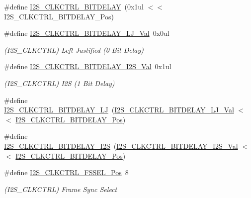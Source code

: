 \begin{DoxyCompactItemize}
\#define \mbox{\hyperlink{group___s_a_m_d21___i2_s_ga2d8c66be6d6b5f64aacba964e48a5ea5}{I2\+S\+\_\+\+C\+L\+K\+C\+T\+R\+L\+\_\+\+B\+I\+T\+D\+E\+L\+AY}}~(0x1ul $<$$<$ I2\+S\+\_\+\+C\+L\+K\+C\+T\+R\+L\+\_\+\+B\+I\+T\+D\+E\+L\+A\+Y\+\_\+\+Pos)
\item 
\#define \mbox{\hyperlink{group___s_a_m_d21___i2_s_ga8f7fa76cbdfa92a9d34cb21798f42e05}{I2\+S\+\_\+\+C\+L\+K\+C\+T\+R\+L\+\_\+\+B\+I\+T\+D\+E\+L\+A\+Y\+\_\+\+L\+J\+\_\+\+Val}}~0x0ul
\begin{DoxyCompactList}\small\item\em (I2\+S\+\_\+\+C\+L\+K\+C\+T\+RL) Left Justified (0 Bit Delay) \end{DoxyCompactList}\item 
\#define \mbox{\hyperlink{group___s_a_m_d21___i2_s_gafcd06500145915a75264200ecd94b82c}{I2\+S\+\_\+\+C\+L\+K\+C\+T\+R\+L\+\_\+\+B\+I\+T\+D\+E\+L\+A\+Y\+\_\+\+I2\+S\+\_\+\+Val}}~0x1ul
\begin{DoxyCompactList}\small\item\em (I2\+S\+\_\+\+C\+L\+K\+C\+T\+RL) I2S (1 Bit Delay) \end{DoxyCompactList}\item 
\#define \mbox{\hyperlink{group___s_a_m_d21___i2_s_ga721f776e9a35c5024dc2e8e8a63a4d15}{I2\+S\+\_\+\+C\+L\+K\+C\+T\+R\+L\+\_\+\+B\+I\+T\+D\+E\+L\+A\+Y\+\_\+\+LJ}}~(\mbox{\hyperlink{group___s_a_m_d21___i2_s_ga8f7fa76cbdfa92a9d34cb21798f42e05}{I2\+S\+\_\+\+C\+L\+K\+C\+T\+R\+L\+\_\+\+B\+I\+T\+D\+E\+L\+A\+Y\+\_\+\+L\+J\+\_\+\+Val}}   $<$$<$ \mbox{\hyperlink{group___s_a_m_d21___i2_s_ga49490bb9926136b0a51f72cf1cb06d0b}{I2\+S\+\_\+\+C\+L\+K\+C\+T\+R\+L\+\_\+\+B\+I\+T\+D\+E\+L\+A\+Y\+\_\+\+Pos}})
\item 
\#define \mbox{\hyperlink{group___s_a_m_d21___i2_s_gabf1e20fabbfe8768c1b8787abe539663}{I2\+S\+\_\+\+C\+L\+K\+C\+T\+R\+L\+\_\+\+B\+I\+T\+D\+E\+L\+A\+Y\+\_\+\+I2S}}~(\mbox{\hyperlink{group___s_a_m_d21___i2_s_gafcd06500145915a75264200ecd94b82c}{I2\+S\+\_\+\+C\+L\+K\+C\+T\+R\+L\+\_\+\+B\+I\+T\+D\+E\+L\+A\+Y\+\_\+\+I2\+S\+\_\+\+Val}}  $<$$<$ \mbox{\hyperlink{group___s_a_m_d21___i2_s_ga49490bb9926136b0a51f72cf1cb06d0b}{I2\+S\+\_\+\+C\+L\+K\+C\+T\+R\+L\+\_\+\+B\+I\+T\+D\+E\+L\+A\+Y\+\_\+\+Pos}})
\item 
\#define \mbox{\hyperlink{group___s_a_m_d21___i2_s_gaa51b72506368a9cf76123c0309c2058f}{I2\+S\+\_\+\+C\+L\+K\+C\+T\+R\+L\+\_\+\+F\+S\+S\+E\+L\+\_\+\+Pos}}~8
\begin{DoxyCompactList}\small\item\em (I2\+S\+\_\+\+C\+L\+K\+C\+T\+RL) Frame Sync Select \end{DoxyCompactList}\item 
$$
\end{DoxyCompactItemize}
